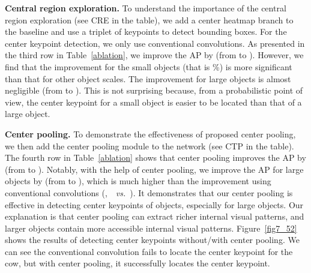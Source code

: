 \documentclass[10pt,twocolumn,letterpaper]{article}
\begin{document}
\vspace{1ex}\noindent\textbf{Central region exploration.} To understand the importance of the central region exploration (see CRE in the table), we add a center heatmap branch to the baseline and use a triplet of keypoints to detect bounding boxes. For the center keypoint detection, we only use conventional convolutions. As presented in the third row in Table~\ref{ablation}, we improve the AP by  (from  to ). However, we find that the improvement for the small objects (that is \%) is more significant than that for other object scales. The improvement for large objects is almost negligible (from  to ). This is not surprising because, from a probabilistic point of view, the center keypoint for a small object is easier to be located than that of a large object. 

\vspace{1ex}\noindent\textbf{Center pooling.} To demonstrate the effectiveness of proposed center pooling, we then add the center pooling module to the network (see CTP in the table). The fourth row in Table~\ref{ablation} shows that center pooling improves the AP by  (from  to ). Notably, with the help of center pooling, we improve the AP for large objects by  (from  to ), which is much higher than the improvement using conventional convolutions (\ie,~~\emph{vs.}~). It demonstrates that our center pooling is effective in detecting center keypoints of objects, especially for large objects. Our explanation is that center pooling can extract richer internal visual patterns, and larger objects contain more accessible internal visual patterns. Figure~\ref{fig7_52} shows the results of detecting center keypoints without/with center pooling. We can see the conventional convolution fails to locate the center keypoint for the cow, but with center pooling, it successfully locates the center keypoint.
\begin{table}[!tb]
\small
\centering
{}
\vspace{-2ex}
\caption{Error analysis of center keypoints via using ground-truth. we replace the predicted center keypoints with the ground-truth values, the results suggest there is still room for improvement in detecting center keypoints.}
\label{Error}
\vspace{-2ex}
\end{table}
\end{document}
